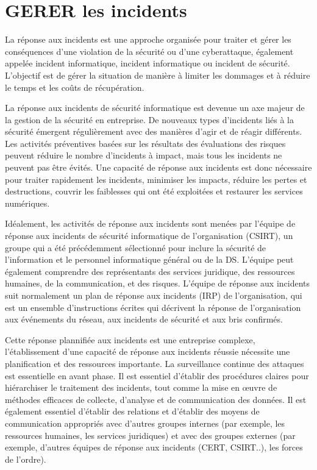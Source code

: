 %
%
\section{GERER les incidents}

La réponse aux incidents est une approche organisée pour traiter et gérer les conséquences d'une violation de la sécurité ou d'une cyberattaque, également appelée incident informatique, incident informatique ou incident de sécurité. L'objectif est de gérer la situation de manière à limiter les dommages et à réduire le temps et les coûts de récupération.

La réponse aux incidents de sécurité informatique est devenue un axe majeur de la gestion de la sécurité en entreprise. De nouveaux types d'incidents liés à la sécurité émergent régulièrement avec des manières d'agir et de réagir différents. Les activités préventives basées sur les résultats des évaluations des risques peuvent réduire le nombre d'incidents à impact, mais tous les incidents ne peuvent pas être évités. Une capacité de réponse aux incidents est donc nécessaire pour traiter rapidement les incidents, minimiser les impacts, réduire les pertes et destructions, couvrir les faiblesses qui ont été exploitées et restaurer les services numériques. 

Idéalement, les activités de réponse aux incidents sont menées par l'équipe de réponse aux incidents de sécurité informatique de l'organisation (CSIRT), un groupe qui a été précédemment sélectionné pour inclure la sécurité de l'information et le personnel informatique général ou de la DS. L'équipe peut également comprendre des représentants des services juridique, des ressources humaines, de la communication, et des risques. L'équipe de réponse aux incidents suit normalement un plan de réponse aux incidents (IRP) de l'organisation, qui est un ensemble d'instructions écrites qui décrivent la réponse de l'organisation aux événements du réseau, aux incidents de sécurité et aux bris confirmés. 

Cette réponse plannifiée aux incidents est une entreprise complexe, l'établissement d'une capacité de réponse aux incidents réussie nécessite une planification et des ressources importante. La surveillance continue des attaques est essentielle en avant phase. Il est essentiel d'établir des procédures claires pour hiérarchiser le traitement des incidents, tout comme la mise en œuvre de méthodes efficaces de collecte, d'analyse et de communication des données. Il est également essentiel d'établir des relations et d'établir des moyens de communication appropriés avec d'autres groupes internes (par exemple, les ressources humaines, les services juridiques) et avec des groupes externes (par exemple, d'autres équipes de réponse aux incidents (CERT, CSIRT..), les forces de l'ordre).

